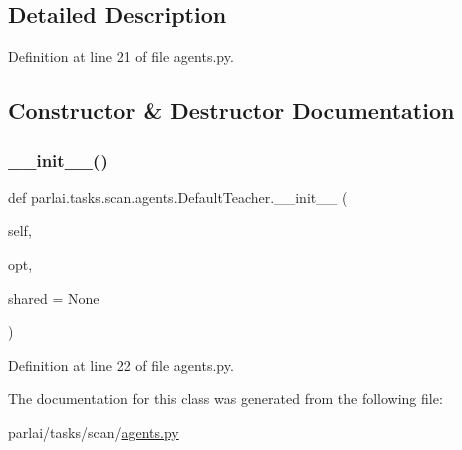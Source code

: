 \subsection{Detailed Description}


Definition at line 21 of file agents.\+py.



\subsection{Constructor \& Destructor Documentation}
\mbox{\label{classparlai_1_1tasks_1_1scan_1_1agents_1_1DefaultTeacher_a113f70356b142f1e9db8e80362287876}} 
\subsubsection{\texorpdfstring{\+\_\+\+\_\+init\+\_\+\+\_\+()}{\_\_init\_\_()}}
{\footnotesize\ttfamily def parlai.\+tasks.\+scan.\+agents.\+Default\+Teacher.\+\_\+\+\_\+init\+\_\+\+\_\+ (\begin{DoxyParamCaption}\item[{}]{self,  }\item[{}]{opt,  }\item[{}]{shared = {\ttfamily None} }\end{DoxyParamCaption})}



Definition at line 22 of file agents.\+py.



The documentation for this class was generated from the following file\+:\begin{DoxyCompactItemize}
\item 
parlai/tasks/scan/\hyperlink{parlai_2tasks_2scan_2agents_8py}{agents.\+py}\end{DoxyCompactItemize}
